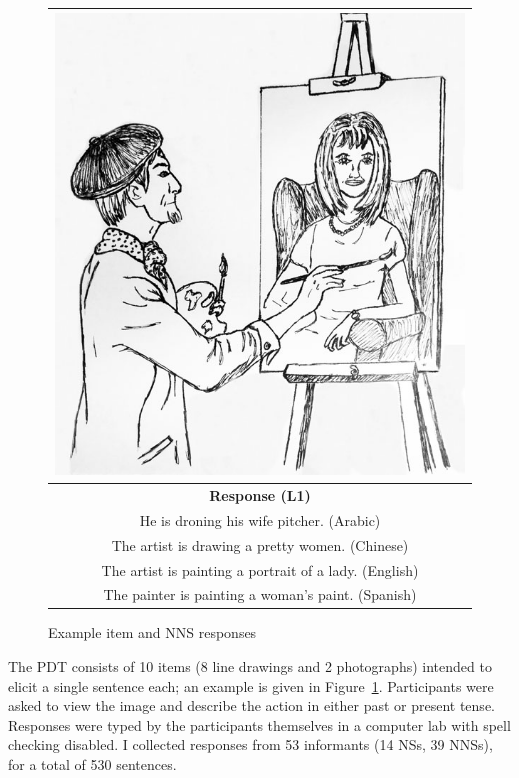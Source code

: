 \begin{figure}[htb!]
\begin{center}
\begin{tabular}{|c|}
\hline
\includegraphics[width=0.8\columnwidth]{figures/exampleprompt.jpg}\\
\hline
\textbf{Response (L1)} \\
\hline
He is droning his wife pitcher. (Arabic)\\
\hline
The artist is drawing a pretty women. (Chinese) \\
\hline
The artist is painting a portrait of a lady. (English) \\
\hline
The painter is painting a woman's paint. (Spanish)\\
\hline
\end{tabular}
\end{center}
\caption{Example item and NNS responses}
\label{fig:example-picture}
\end{figure}

The PDT consists of 10 items (8 line drawings and 2 photographs) intended to elicit a single sentence each; an example is given in Figure~\ref{fig:example-picture}. Participants
were asked to view the image and describe the action in either past or present tense. Responses were typed by the participants themselves in a computer lab with spell checking disabled.
I collected responses from 53
informants (14 NSs, 39 NNSs), for a total of 530 sentences. 
